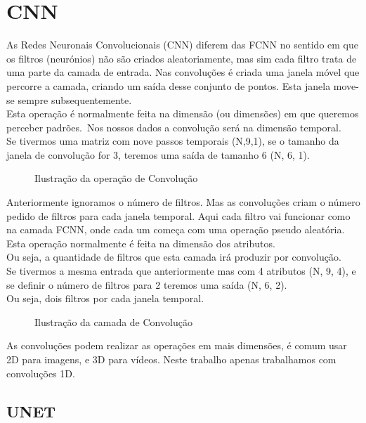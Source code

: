 \section{CNN\label{se:cnn_sec}}
As Redes Neuronais Convolucionais (CNN) diferem das FCNN no sentido em que os filtros (neurónios) não são criados aleatoriamente, mas sim cada filtro trata de uma parte da camada de entrada. Nas convoluções é criada uma janela móvel que percorre a camada, criando um saída desse conjunto de pontos. Esta janela move-se sempre subsequentemente.\\
Esta operação é normalmente feita na dimensão (ou dimensões) em que queremos perceber padrões.\
Nos nossos dados a convolução será na dimensão temporal.\\
Se tivermos uma matriz com nove passos temporais (N,9,1), se o tamanho da janela de convolução for 3, teremos uma saída de tamanho 6 (N, 6, 1).\\
\begin{figure}[H]
	\centering
	\resizebox{\linewidth}{!}{}
	\caption{Ilustração da operação de Convolução}
	\label{fig:conv_layer1D}
\end{figure}

Anteriormente ignoramos o número de filtros. Mas as convoluções criam o número pedido de filtros para cada janela temporal. Aqui cada filtro vai funcionar como na camada FCNN, onde cada um começa com uma operação pseudo aleatória. Esta operação normalmente é feita na dimensão dos atributos.\\
Ou seja, a quantidade de filtros que esta camada irá produzir por convolução.\\
Se tivermos a mesma entrada que anteriormente mas com 4 atributos (N, 9, 4), e se definir o número de filtros para 2 teremos uma saída (N, 6, 2).\\
Ou seja, dois filtros por cada janela temporal.\\


\begin{figure}[H]
	\centering
	\resizebox{\linewidth}{!}{}
	\caption{Ilustração da camada de Convolução}
	\label{fig:conv_layer}
\end{figure}

As convoluções podem realizar as operações em mais dimensões, é comum usar 2D para imagens, e 3D para vídeos. Neste trabalho apenas trabalhamos com convoluções 1D.\\

\subsection{UNET\label{se:unet_sec}}


